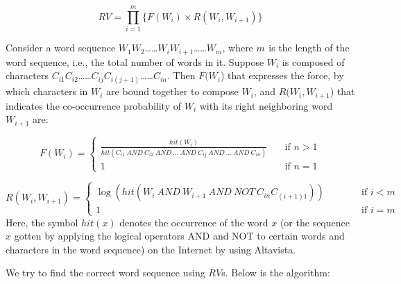 \begin{equation}
RV = \prod_{i=1}^m \{F(W_{i}){\times}R(W_{i},W_{i+1})\}
\end{equation}

Consider a word sequence $W_{1}W_{2}$……$W_{i}W_{i+1}$……$W_{m}$,
where $m_{}$ is the length of the word sequence, i.e., the total number of words
in it. Suppose $W_{i}$ is composed of characters $C_{i1}C_{i2}$……$C_{ij}C_{i(j+1)}$……$C_{in}$.
Then $F(W_{i}$) that expresses the force,
by which characters in $W_{i}$ are bound together to compose $W_{i}$,
and $R(W_{i}, W_{i+1}$) that indicates the co-occurrence probability of $W_{i}$
with its right neighboring word $W_{i+1}$ are:

\begin{equation}
F(W_{i}) = \left\{
	\begin{array}{ll}
		\displaystyle{\frac{hit(W_{i})}{hit(C_{i1}~AND~C_{i2}~AND~...~AND~C_{ij}~AND~...~AND~C_{in})}}&
			\quad \mbox{if $n>1$} \\[0.3cm]
		\displaystyle{1}& 
			\quad \mbox{if $n=1$} 
	\end{array} \right.
\end{equation}

\begin{equation}
R(W_{i},W_{i+1}) = \left\{
	\begin{array}{ll}
		\displaystyle{\log (hit(W_{i}~AND~W_{i+1}~AND~NOT~C_{in}C_{(i+1)1}))}&
			\qquad\quad \mbox{if $i<m$} \\[0.2cm]
		\displaystyle{1}& 
			\qquad\quad \mbox{if $i=m$} 
	\end{array} \right.
\end{equation}
Here, the symbol $hit(x)$ denotes the occurrence of the word $x$
(or the sequence $x$ gotten by applying the logical operators AND and NOT
to certain words and characters in the word sequence)
on the Internet by using Altavista.

We try to find the correct word sequence using $RV$s.
Below is the algorithm:

\vspace{10pt}


